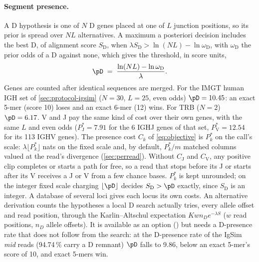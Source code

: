\documentclass[11pt,a4paper]{article}
\begin{document}
\paragraph{Segment presence.} A D hypothesis is one of $N$ D genes placed at
one of $L$ junction positions, so its prior is spread over $NL$ alternatives.
A maximum a posteriori decision includes the best D, of alignment score
$S_{\mathrm D}$, when $\lambda S_{\mathrm D} > \ln(NL) - \ln\omega_{\mathrm D}$,
with $\omega_{\mathrm D}$ the prior odds of a D against none, which gives the
threshold, in score units,
\begin{equation}
  \pD \;=\; \frac{\ln(NL) - \ln \omega_{\mathrm D}}{\lambda}.
  \label{eq:pd}
\end{equation}
Genes are counted after identical sequences are merged. For the IMGT human
IGH set of \cref{sec:protocol-igsim} ($N=30$, $L=25$, even odds)
$\pD=10.45$: an exact
5-mer (score 10) loses and an exact 6-mer (12) wins. For TRB ($N=2$)
$\pD=6.17$. V and J pay the same kind of cost over their own genes, with the
same $L$ and even odds ($P^{*}_{\mathrm J}=7.91$ for the 6 IGHJ genes of that
set, $P^{*}_{\mathrm V}=12.54$ for its 113 IGHV genes). The presence cost
$C_k$ of \cref{eq:objective} is $P^{*}_k$ on the call's scale:
$\lambda\lfloor P^{*}_k\rfloor$ nats on the fixed scale and, by default,
$P^{*}_k/m$ matched columns valued at the read's divergence
(\cref{sec:perread}).
Without $C_{\mathrm J}$ and
$C_{\mathrm V}$, any positive clip completes or starts a path for free, so a read that
stops before its J or starts after its V receives a J or V from a few chance
bases. $P^{*}_k$ is kept unrounded; on the integer fixed scale charging
$\lfloor \pD\rfloor$ decides $S_{\mathrm D}>\pD$ exactly, since
$S_{\mathrm D}$ is an integer. A database of several loci
gives each locus its own costs. An alternative derivation counts the
hypotheses a local D search actually tries, every allele offset and read
position, through the Karlin--Altschul expectation $K w n_D e^{-\lambda S}$
($w$ read positions, $n_D$ allele offsets). It is available as an option
() but needs a D-presence rate that does not follow
from the search: at the D-presence rate of the IgSim \emph{mid} reads
(94.74\,\% carry a D remnant) $\pD$ falls to 9.86, below an exact 5-mer's
score of 10, and exact 5-mers win.
\end{document}
